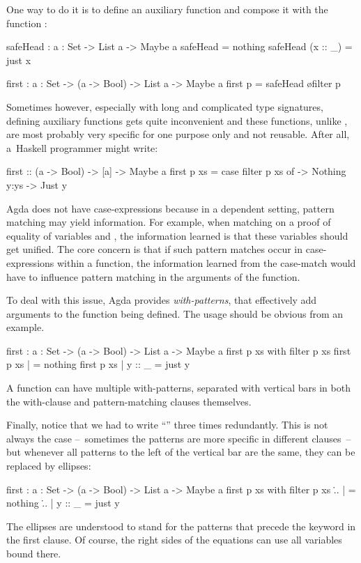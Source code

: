 One way to do it is to define an auxiliary function and compose it with the function
:
\begin{code}
  safeHead : {a : Set} -> List a -> Maybe a
  safeHead \NIL = nothing
  safeHead (x :: _) = just x
  
  first : {a : Set} -> (a -> Bool) -> List a -> Maybe a
  first p = safeHead \o filter p
\end{code}
Sometimes however, especially with long and complicated type signatures,
defining auxiliary functions gets quite inconvenient and these functions,
unlike , are most probably very specific for one purpose only
and not reusable. After all, a~Haskell programmer might write:
\begin{code}
  first :: (a -> Bool) -> [a] -> Maybe a
  first p xs = case filter p xs of
    \NIL -> Nothing
    y:ys -> Just y
\end{code}
Agda does not have case-expressions because in a dependent setting, pattern matching may yield
information. For example, when matching on a proof of equality of variables  and ,
the information learned is that these variables should get unified.
The core concern is that if such pattern matches occur in case-expressions within a function,
the information learned from the case-match would have to influence pattern matching
in the arguments of the function.

To deal with this issue, Agda provides
\emph{with-patterns}, that effectively add arguments to the function being defined. The
usage should be obvious from an example.
\begin{code}
  first : {a : Set} -> (a -> Bool) -> List a -> Maybe a
  first p xs with filter p xs
  first p xs | \NIL = nothing
  first p xs | y :: _ = just y
\end{code}
A function can have multiple with-patterns, separated with vertical bars in both the
with-clause and pattern-matching clauses themselves.

Finally, notice that we had to write ``'' three times redundantly.
This is not always the case --~sometimes the patterns are more specific in different
clauses~-- but whenever all patterns to the left of the vertical bar are the same,
they can be replaced by ellipses:
\begin{code}
  first : {a : Set} -> (a -> Bool) -> List a -> Maybe a
  first p xs with filter p xs
  \... | \NIL = nothing
  \... | y :: _ = just y
\end{code}
The ellipses are understood to stand for the patterns that precede the keyword 
in the first clause. Of course, the right sides of the equations can use all variables bound
there.

